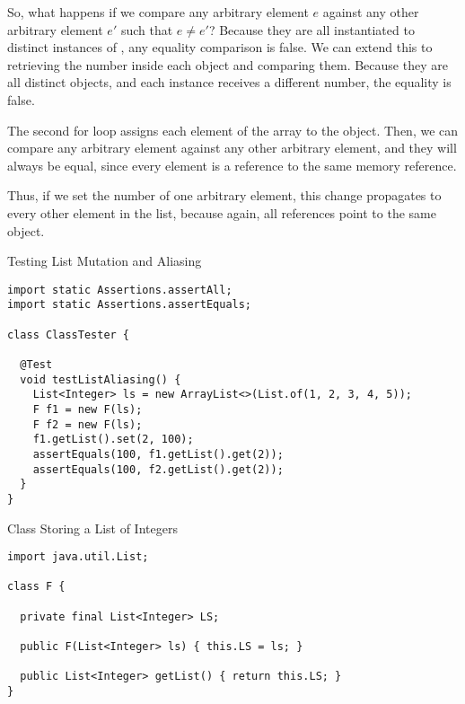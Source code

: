 So, what happens if we compare any arbitrary element $e$ against any other arbitrary element $e'$ such that $e \neq e'$? Because they are all instantiated to distinct instances of , any equality comparison is false. We can extend this to retrieving the number inside each  object and comparing them. Because they are all distinct objects, and each  instance receives a different number, the equality is false.

The second for loop assigns each element of the array to the  object. Then, we can compare any arbitrary element against any other arbitrary element, and they will always be equal, since every element is a reference to the same memory reference. 

Thus, if we set the number of one arbitrary element, this change propagates to every other element in the list, because again, all references point to the same object.


\begin{cl}[]{Testing List Mutation and Aliasing}
\begin{lstlisting}[language=MyJava]
import static Assertions.assertAll;
import static Assertions.assertEquals;

class ClassTester {

  @Test
  void testListAliasing() {
    List<Integer> ls = new ArrayList<>(List.of(1, 2, 3, 4, 5));
    F f1 = new F(ls);
    F f2 = new F(ls);
    f1.getList().set(2, 100);
    assertEquals(100, f1.getList().get(2));
    assertEquals(100, f2.getList().get(2));
  }
}
\end{lstlisting}
\end{cl}

\begin{cl}[]{Class Storing a List of Integers}
\begin{lstlisting}[language=MyJava]
import java.util.List;

class F {
  
  private final List<Integer> LS;
  
  public F(List<Integer> ls) { this.LS = ls; }
  
  public List<Integer> getList() { return this.LS; }
}
\end{lstlisting}
\end{cl}
